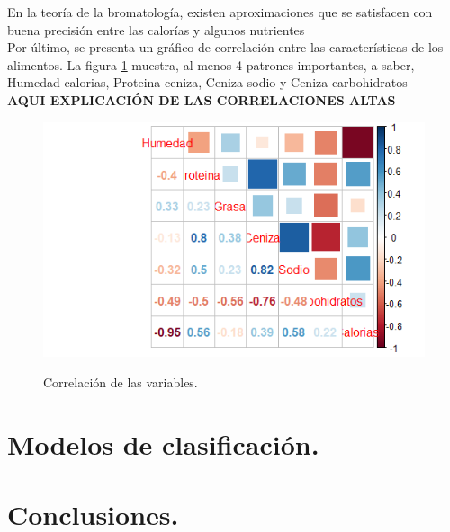 \documentclass[12pt, letterpaper]{article}
\begin{document}
En la teoría de la bromatología, existen aproximaciones que se satisfacen con buena precisión entre las calorías y algunos nutrientes\\

Por último, se presenta un gráfico de correlación entre las características de los alimentos. La figura \ref{i11} muestra, al menos 4 patrones importantes, a saber, Humedad-calorias, Proteina-ceniza, Ceniza-sodio y Ceniza-carbohidratos\\

\textbf{AQUI EXPLICACIÓN DE LAS CORRELACIONES ALTAS}

\begin{figure}[h]
\centering
\includegraphics[scale=1]{images/corr.png} 
\label{i11}
\caption{Correlación de las variables.}
\end{figure}



\section{Modelos de clasificación.}

\section{Conclusiones.}
\end{document}
